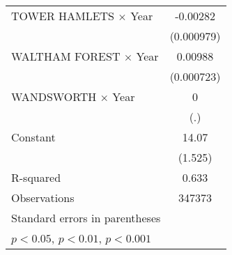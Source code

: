 {\begin{longtable}{l*{1}{c}}
\addlinespace
TOWER HAMLETS $\times$ Year&    -0.00282\sym{**} \\
                    &  (0.000979)         \\
\addlinespace
WALTHAM FOREST $\times$ Year&     0.00988\sym{***}\\
                    &  (0.000723)         \\
\addlinespace
WANDSWORTH $\times$ Year&           0         \\
                    &         (.)         \\
\addlinespace
Constant            &       14.07\sym{***}\\
                    &     (1.525)         \\
\midrule
R-squared           &       0.633         \\
Observations        &      347373         \\
\bottomrule
\multicolumn{2}{l}{\footnotesize Standard errors in parentheses}\\
\multicolumn{2}{l}{\footnotesize \sym{*} \(p<0.05\), \sym{**} \(p<0.01\), \sym{***} \(p<0.001\)}\\
\end{longtable}
}

